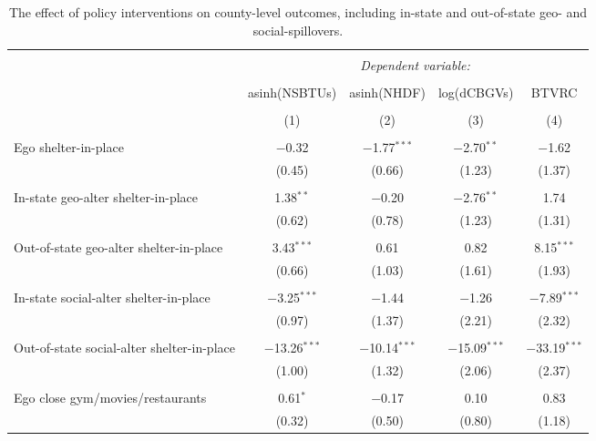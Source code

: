 
\begin{table}[!htbp] \centering 
  \caption{The effect of policy interventions on county-level outcomes, including in-state and out-of-state geo- and social-spillovers.} 
  \label{tab:diff_in_diff_geo_split_state} 
\footnotesize 
\begin{tabular}{@{\extracolsep{5pt}}lcccc} 
\\[-1.8ex]\hline 
\hline \\[-1.8ex] 
 & \multicolumn{4}{c}{\textit{Dependent variable:}} \\ 
\cline{2-5} 
\\[-1.8ex] & asinh(NSBTUs) & asinh(NHDF) & log(dCBGVs) & BTVRC \\ 
\\[-1.8ex] & (1) & (2) & (3) & (4)\\ 
\hline \\[-1.8ex] 
 Ego shelter-in-place & $-$0.32 & $-$1.77$^{***}$ & $-$2.70$^{**}$ & $-$1.62 \\ 
  & (0.45) & (0.66) & (1.23) & (1.37) \\ 
  & & & & \\ 
 In-state geo-alter shelter-in-place & 1.38$^{**}$ & $-$0.20 & $-$2.76$^{**}$ & 1.74 \\ 
  & (0.62) & (0.78) & (1.23) & (1.31) \\ 
  & & & & \\ 
 Out-of-state geo-alter shelter-in-place & 3.43$^{***}$ & 0.61 & 0.82 & 8.15$^{***}$ \\ 
  & (0.66) & (1.03) & (1.61) & (1.93) \\ 
  & & & & \\ 
 In-state social-alter shelter-in-place & $-$3.25$^{***}$ & $-$1.44 & $-$1.26 & $-$7.89$^{***}$ \\ 
  & (0.97) & (1.37) & (2.21) & (2.32) \\ 
  & & & & \\ 
 Out-of-state social-alter shelter-in-place & $-$13.26$^{***}$ & $-$10.14$^{***}$ & $-$15.09$^{***}$ & $-$33.19$^{***}$ \\ 
  & (1.00) & (1.32) & (2.06) & (2.37) \\ 
  & & & & \\ 
 Ego close gym/movies/restaurants & 0.61$^{*}$ & $-$0.17 & 0.10 & 0.83 \\ 
  & (0.32) & (0.50) & (0.80) & (1.18) \\ 

\end{tabular}
\end{table}

